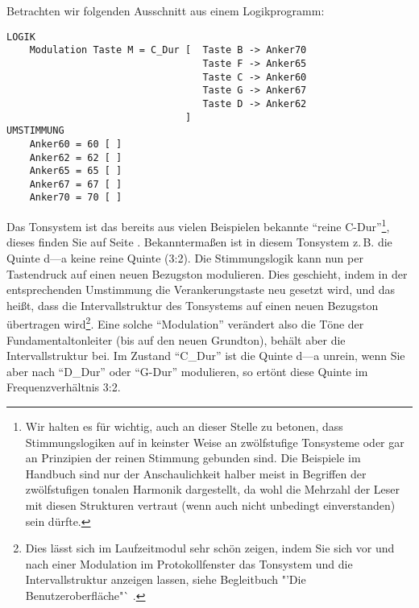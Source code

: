 Betrachten wir folgenden Ausschnitt aus einem Logikprogramm:
\begin{verbatim}
LOGIK
    Modulation Taste M = C_Dur [  Taste B -> Anker70
                                  Taste F -> Anker65
                                  Taste C -> Anker60
                                  Taste G -> Anker67
                                  Taste D -> Anker62
                               ]
UMSTIMMUNG
    Anker60 = 60 [ ]
    Anker62 = 62 [ ]
    Anker65 = 65 [ ]
    Anker67 = 67 [ ]
    Anker70 = 70 [ ]
\end{verbatim}
Das Tonsystem  ist das bereits aus vielen Beispielen
bekannte "`reine C-Dur"'\footnote{Wir halten es für wichtig, auch an
  dieser Stelle zu betonen, dass Stimmungslogiken auf \mutabor{} in
  keinster Weise an zwölfstufige Tonsysteme oder gar an Prinzipien der
  reinen Stimmung gebunden sind. Die Beispiele im Handbuch sind nur
  der Anschaulichkeit halber meist in Begriffen der zwölfstufigen
  tonalen Harmonik dargestellt, da wohl die Mehrzahl der Leser mit
  diesen Strukturen vertraut (wenn auch nicht unbedingt einverstanden)
  sein dürfte.}, dieses finden Sie auf Seite \pageref{CDUR}.
Bekanntermaßen ist in diesem Tonsystem z.\,B. die Quinte d---a keine
reine Quinte (3:2). Die Stimmungslogik  kann nun per
Tastendruck auf einen neuen Bezugston modulieren.
Dies geschieht, indem in der entsprechenden Umstimmung die
Verankerungstaste neu gesetzt wird, und das heißt, dass die
Intervallstruktur des Tonsystems  auf einen neuen
Bezugston übertragen wird\footnote{Dies lässt sich im Laufzeitmodul
  sehr schön zeigen, indem Sie sich vor und nach einer Modulation im
  Protokollfenster das Tonsystem und die Intervallstruktur anzeigen
  lassen, siehe Begleitbuch "'Die Benutzeroberfläche"` .}. Eine solche
"`Modulation"' verändert also die Töne der Fundamentaltonleiter (bis
auf den neuen Grundton), behält aber die Intervallstruktur bei. Im
Zustand "`C\_Dur"' ist die Quinte d---a unrein, wenn Sie aber nach
"`D\_Dur"' oder "`G-Dur"' modulieren, so ertönt diese Quinte im
Frequenzverhältnis 3:2.

